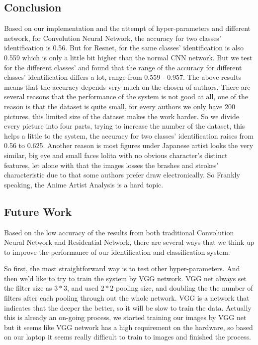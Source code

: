 \documentclass{article}
\begin{document}
\subsection{Conclusion}
Based on our implementation and the attempt of hyper-parameters and different network, for Convolution Neural Network, the accuracy for two classes' identification is 0.56. But for Resnet, for the same classes' identification is also 0.559 which is only a little bit higher than the normal CNN network. But we test for the different classes' and found that the range of the accuracy for different classes' identification differs a lot, range from 0.559 - 0.957. The above results means that the accuracy depends very much on the chosen of authors. There are several reasons that the performance of the system is not good at all, one of the reason is that the dataset is quite small, for every authors we only have 200 pictures, this limited size of the dataset makes the work harder. So we divide every picture into four parts, trying to increase the number of the dataset, this helps a little to the system, the accuracy for two classes' identification raises from 0.56 to 0.625. Another reason is most figures under Japanese artist looks the very similar, big eye and small faces lolita with no obvious character's distinct features, let alone with that the images losses the brashes and strokes' characteristic due to that some authors prefer draw electronically. So Frankly speaking, the Anime Artist Analysis is a hard topic. 
    
\subsection{Future Work}
Based on the low accuracy of the results from both traditional Convolution Neural Network and Residential Network, there are several ways that we think up to improve the performance of our identification and classification system. 

So first, the most straightforward way is to test other hyper-parameters. And then we'd like to try to train the system by VGG network. VGG net always set the filter size as $3*3$, and used $2*2$ pooling size, and doubling the the number of filters after each pooling through out the whole network. VGG is a network that indicates that the deeper the better, so it will be slow to train the data. Actually this is already an on-going process, we started training our images by VGG net but it seems like VGG network has a high requirement on the hardware, so based on our laptop it seems really difficult to train to images and finished the process. 
\end{document}
